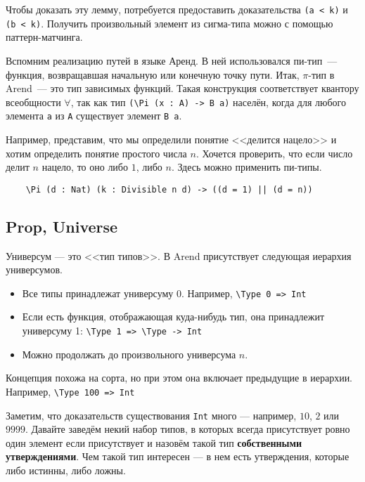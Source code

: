 Чтобы доказать эту лемму, потребуется предоставить доказательства \texttt{(a < k)} и \texttt{(b < k)}.
Получить произвольный элемент из сигма-типа можно с помощью паттерн-матчинга.

\medskip
Вспомним реализацию путей в языке Аренд. В ней использовался пи-тип~--- функция, возвращавшая начальную или конечную точку пути.
Итак, $\pi$-тип в Arend~--- это тип зависимых функций. Такая конструкция соответствует квантору всеобщности $\forall$, так как
тип \texttt{(\textbackslash Pi (x : A) -> B a)} населён, когда для любого элемента \texttt{a} из \texttt{A} существует элемент \texttt{B~a}. 

Например, представим, что мы определили понятие <<делится нацело>> и хотим определить понятие простого числа $n$.
Хочется проверить, что если число делит $n$ нацело, то оно либо $1$, либо $n$. Здесь можно применить пи-типы.
\begin{verbatim}
    \Pi (d : Nat) (k : Divisible n d) -> ((d = 1) || (d = n))
\end{verbatim}

\newpage

\subsection{Prop, Universe}

Универсум --- это <<тип типов>>. В Arend присутствует следующая иерархия универсумов.

\begin{itemize}
    \item Все типы принадлежат универсуму 0. Например, \texttt{\textbackslash Type 0 => Int}
    \item Если есть функция, отображающая куда-нибудь тип, она принадлежит универсуму 1: \texttt{\textbackslash Type 1 => \textbackslash Type -> Int}
    \item Можно продолжать до произвольного универсума $n$.
\end{itemize}

Концепция похожа на сорта, но при этом она включает предыдущие в иерархии. Например, \texttt{\textbackslash Type 100 => Int}

\medskip
Заметим, что доказательств существования \texttt{Int} много --- например, $10$, $2$ или $9999$.
Давайте заведём некий набор типов, в которых всегда присутствует ровно один элемент если присутствует и назовём такой тип \textbf{собственными утверждениями}.
Чем такой тип интересен --- в нем есть утверждения, которые либо истинны, либо ложны.

